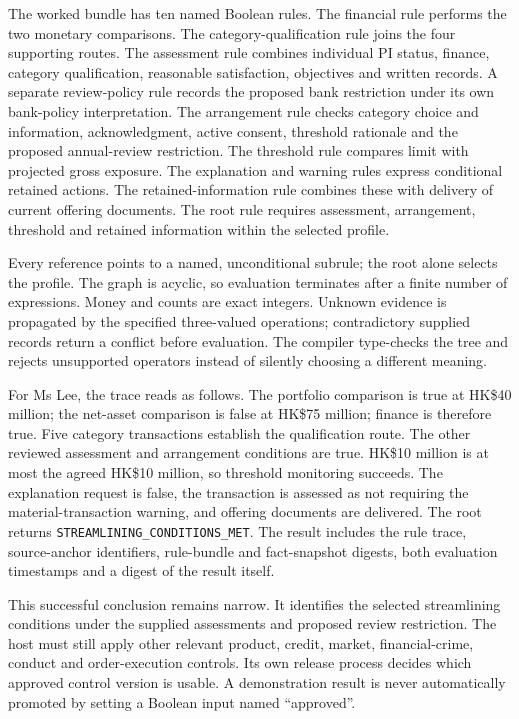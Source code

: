 The worked bundle has ten named Boolean rules. The financial rule performs the
two monetary comparisons. The category-qualification rule joins the four
supporting routes. The assessment rule combines individual PI status, finance,
category qualification, reasonable satisfaction, objectives and written records.
A separate review-policy rule records the proposed bank restriction under its
own bank-policy interpretation. The arrangement rule checks category choice and information, acknowledgment,
active consent, threshold rationale and the proposed annual-review restriction.
The threshold rule compares limit with projected gross exposure. The explanation
and warning rules express conditional retained actions. The retained-information
rule combines these with delivery of current offering documents. The root rule
requires assessment, arrangement, threshold and retained information within the
selected profile.

Every reference points to a named, unconditional subrule; the root alone selects
the profile. The graph is acyclic, so evaluation terminates after a finite number
of expressions. Money and counts are exact integers. Unknown evidence is
propagated by the specified three-valued operations; contradictory supplied
records return a conflict before evaluation. The compiler type-checks the tree
and rejects unsupported operators instead of silently choosing a different
meaning.

For Ms Lee, the trace reads as follows. The portfolio comparison is true at
HK\$40 million; the net-asset comparison is false at HK\$75 million; finance
is therefore true. Five category transactions establish the qualification route.
The other reviewed assessment and arrangement conditions are true. HK\$10
million is at most the agreed HK\$10 million, so threshold monitoring succeeds.
The explanation request is false, the transaction is assessed as not requiring
the material-transaction warning, and offering documents are delivered. The root
returns \texttt{STREAMLINING\_CONDITIONS\_MET}. The result includes the rule
trace, source-anchor identifiers, rule-bundle and fact-snapshot digests, both
evaluation timestamps and a digest of the result itself.

This successful conclusion remains narrow. It identifies the selected
streamlining conditions under the supplied assessments and proposed review
restriction. The host must still apply other relevant product, credit, market,
financial-crime, conduct and order-execution controls. Its own release process
decides which approved control version is usable. A demonstration result is
never automatically promoted by setting a Boolean input named ``approved''.

